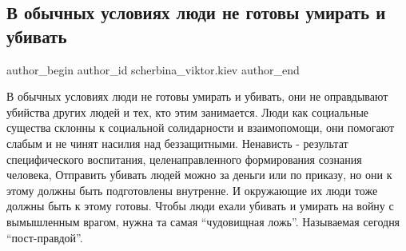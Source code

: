  
 
 
 
 
 
\subsection{В обычных  условиях люди не готовы умирать и убивать}
\label{sec:20_01_2022.fb.scherbina_viktor.kiev.1.ludi_postpravda}
 
\ifcmt
 author_begin
   author_id scherbina_viktor.kiev
 author_end
\fi

В обычных  условиях люди не готовы умирать и убивать, они не оправдывают
убийства других людей и тех, кто этим занимается. Люди как социальные существа
склонны к социальной солидарности и взаимопомощи, они помогают слабым и не
чинят насилия над беззащитными. Ненависть - результат специфического
воспитания, целенаправленного формирования сознания человека,  Отправить
убивать людей  можно за деньги или по приказу, но они к этому должны быть
подготовлены внутренне. И окружающие их люди тоже должны быть к этому готовы.
Чтобы люди ехали убивать и умирать  на войну с вымышленным врагом, нужна та
самая \enquote{чудовищная ложь}. Называемая сегодня \enquote{пост-правдой}.

